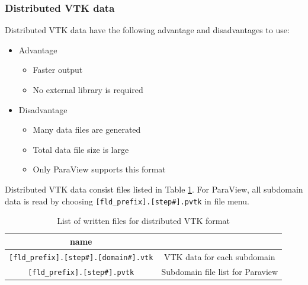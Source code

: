 \subsubsection{Distributed VTK data}
Distributed VTK data have the following advantage and disadvantages to use:
%
\begin{itemize}
\item Advantage
\begin{itemize} 
\item Faster output
\item No external library is required
\end{itemize}
\item Disadvantage
\begin{itemize} 
\item Many data files are generated
\item Total data file size is large
\item Only ParaView supports this format
\end{itemize}
\end{itemize}
%
Distributed VTK data consist files listed in Table \ref{table:parallel_vtk}. For ParaView, all subdomain data is read by choosing \verb|[fld_prefix].[step#].pvtk| in file menu.
%
\begin{table}[htp]
\caption{List of written files for distributed VTK format}
\begin{center} 
\begin{tabular}{|c|c|}
\hline
 name &  \\ \hline \hline
\verb|[fld_prefix].[step#].[domain#].vtk|  & VTK data for each subdomain  \\ \hline
\verb|[fld_prefix].[step#].pvtk| & Subdomain file list for Paraview  \\ \hline
\end{tabular}
\end{center}
\label{table:parallel_vtk}
\end{table}
%

